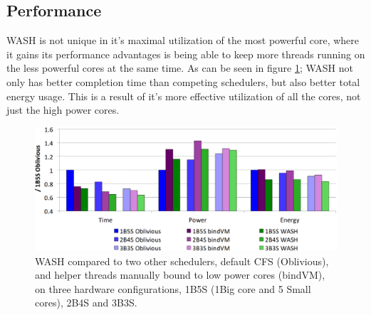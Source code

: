 \subsection{Performance}
WASH is not unique in it's maximal utilization of the most powerful core, where it gains its performance advantages is being able to keep more threads running on the less powerful cores at the same time.
As can be seen in figure \ref{fig:WASH_benchmarks}; WASH not only has better completion time than competing schedulers, but also better total energy usage.
This is a result of it's more effective utilization of all the cores, not just the high power cores. 
\begin{figure}[h]
	\includegraphics[width=\textwidth]{images/WASH_benchmarks.jpg}
	\caption{WASH compared to two other schedulers, default CFS (Oblivious), and helper threads manually bound to low power cores (bindVM), on three hardware configurations, 1B5S  (1Big core and 5 Small cores), 2B4S and 3B3S\cite{Jibaja:2016:PPA:2854038.2854047}.}
	\label{fig:WASH_benchmarks}
\end{figure}